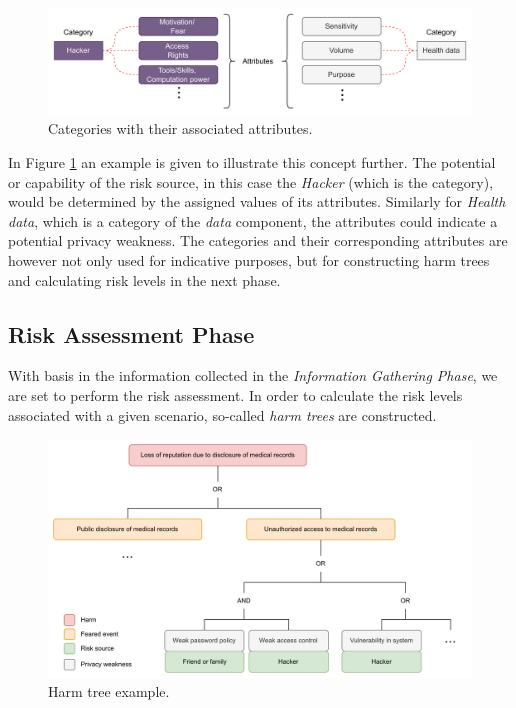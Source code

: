 \begin{figure}[hbt!]
  \centering
  \includegraphics[width=\textwidth]{pictures/cat_att.png}
  \caption{Categories with their associated attributes.}
  \label{fig:cat_att}
\end{figure}

In Figure \ref{fig:cat_att} an example is given to illustrate this concept
further. The potential or capability of the risk source, in this case the
\textit{Hacker} (which is the category), would be determined by the assigned
values of its attributes. Similarly for \textit{Health data}, which is a
category of the \textit{data} component, the attributes could indicate a
potential privacy weakness. The categories and their corresponding attributes
are however not only used for indicative purposes, but for constructing harm
trees and calculating risk levels in the next phase.

\subsection{Risk Assessment Phase}
With basis in the information collected in the \textit{Information Gathering
Phase}, we are set to perform the risk assessment. In order to calculate the
risk levels associated with a given scenario, so-called \textit{harm trees} are
constructed.

\begin{figure}[hbt!]
  \centering
  \includegraphics[width=\textwidth]{pictures/harm_tree_ex.png}
  \caption{Harm tree example.}
  \label{fig:harm_tree_ex}
\end{figure}

